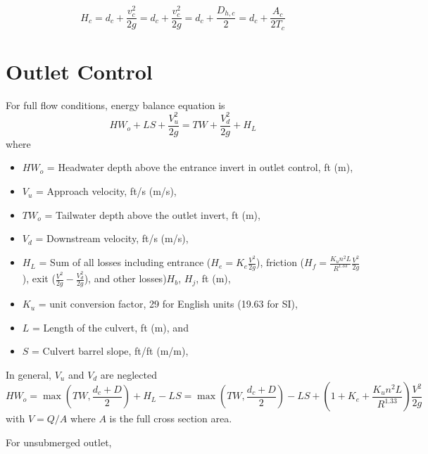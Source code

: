 \documentclass[12pt, a4paper]{article}
\begin{document}
\begin{equation}
H_c = d_c + \frac{v_c^2}{2g} = d_c + \frac{v_c^2}{2g} = d_c + \frac{D_{h,c}}{2} = d_c + \frac{A_c}{2T_c}
\end{equation}


\section{Outlet Control}
For full flow conditions, energy balance equation is
\begin{equation}
HW_o + LS + \frac{V_u^2}{2g} = TW + \frac{V_d^2}{2g} + H_L
\end{equation}
where
\begin{itemize}
\item[] $HW_o$ = Headwater depth above the entrance invert in outlet control, ft (m),
\item[] $V_u$ = Approach velocity, ft/s (m/s),
\item[] $TW_o$ = Tailwater depth above the outlet invert, ft (m),
\item[] $V_d$ = Downstream velocity, ft/s (m/s),
\item[] $H_L$ = Sum of all losses including entrance ($H_e=K_e\frac{V^2}{2g}$), friction ($H_f=\frac{K_un^2L}{R^1.33}\frac{V^2}{2g}$),  exit ($\frac{V^2}{2g} - \frac{V_d^2}{2g}$), and other losses)$H_b$, $H_j$, ft (m),
\item[] $K_u$ = unit conversion factor, 29 for English units (19.63 for SI),
\item[] $L$ = Length of the culvert, ft (m), and
\item[] $S$ = Culvert barrel slope, ft/ft (m/m),
\end{itemize}

In general, $V_u$ and $V_d$ are neglected
\begin{equation}
HW_o =\max(TW, \frac{d_c + D}{2}) + H_L - LS = \max(TW, \frac{d_c + D}{2}) - LS + \left(1 + K_e +  \frac{K_un^2L}{R^1.33}\right)\frac{V^2}{2g}
\end{equation}
with $V = Q/A$ where $A$ is the full cross section area.

For unsubmerged outlet, 
%
%
%
%
%
%
%
%
%

%
%
\end{document}

